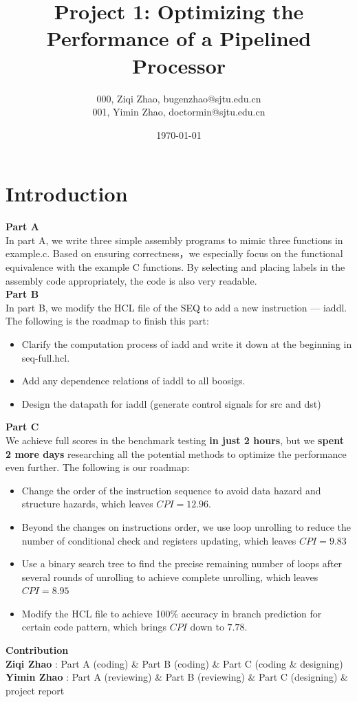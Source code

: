 \documentclass{article}
\title{\textbf{Project 1: Optimizing the Performance of a Pipelined Processor}} %
\author{000, Ziqi Zhao, bugenzhao@sjtu.edu.cn \\
        001, Yimin Zhao, doctormin@sjtu.edu.cn \\ } %
\date{\today} %
\begin{document}
\maketitle %

\section{Introduction}
\textbf{Part A}
\\
In part A, we write three simple assembly programs to mimic three functions in example.c. 
Based on ensuring correctness，we especially focus on the functional equivalence with the example C functions. 
By selecting and placing labels in the assembly code appropriately, the code is also very readable.\\
\textbf{Part B}
\\
In part B, we modify the HCL file of the SEQ to add a new instruction --- iaddl. 
The following is the roadmap to finish this part:
\begin{itemize}
        \item Clarify the computation process of iadd and write it down at the beginning in seq-full.hcl.
        \item Add any dependence relations of iaddl to all boosigs.
        \item Design the datapath for iaddl (generate control signals for src and dst)
\end{itemize}
\textbf{Part C}
\\
We achieve full scores in the benchmark testing \textbf{in just 2 hours}, 
but we \textbf{spent 2 more days} researching all the potential methods to optimize the performance even further. 
The following is our roadmap:
\begin{itemize}
        \item Change the order of the instruction sequence to avoid data hazard and structure hazards, which leaves $CPI = 12.96$.
        \item Beyond the changes on instructions order, we use loop unrolling to reduce the number of conditional check and registers updating, which leaves $CPI = 9.83$
        \item Use a binary search tree to find the precise remaining number of loops after several rounds of unrolling to achieve complete unrolling, which leaves $CPI = 8.95$
        \item Modify the HCL file to achieve 100\% accuracy in branch prediction for certain code pattern, which brings $CPI$ down to $7.78$.
\end{itemize}
\textbf{Contribution}
\\
\textbf{Ziqi Zhao} : Part A (coding) \& Part B (coding) \& Part C (coding \& designing) \\
\textbf{Yimin Zhao} : Part A (reviewing) \& Part B (reviewing) \& Part C (designing) \& project report
\end{document}
